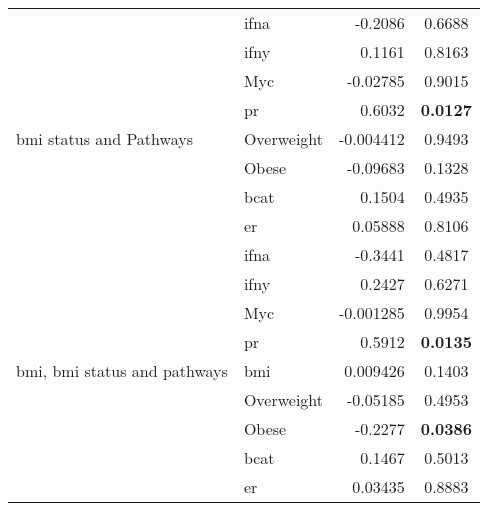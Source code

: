 \begin{table}[htpb]
\begin{threeparttable}
\begin{tabular}{llrc}
                                                                           & \gls{ifna} & -0.2086   & 0.6688 \\
                                                                           & \gls{ifny} & 0.1161    & 0.8163 \\
                                                                           & Myc        & -0.02785  & 0.9015 \\
                                                                           & \gls{pr}   & 0.6032    & \bfseries 0.0127  \\
				\hline
				\rule{0pt}{2.25ex}\gls{bmi} status and Pathways            & Overweight & -0.004412 & 0.9493 \\
                                                                           & Obese      & -0.09683  & 0.1328 \\
                                                                           & \gls{bcat} & 0.1504    & 0.4935 \\
                                                                           & \gls{er}   & 0.05888   & 0.8106 \\
                                                                           & \gls{ifna} & -0.3441   & 0.4817 \\
                                                                           & \gls{ifny} & 0.2427    & 0.6271 \\
                                                                           & Myc        & -0.001285 & 0.9954 \\
                                                                           & \gls{pr}   & 0.5912    & \bfseries 0.0135  \\
				\hline
				\rule{0pt}{2.25ex}\gls{bmi}, \gls{bmi} status and pathways & \gls{bmi}  & 0.009426  & 0.1403 \\
                                                                           & Overweight & -0.05185  & 0.4953 \\
                                                                           & Obese      & -0.2277   & \bfseries 0.0386  \\
                                                                           & \gls{bcat} & 0.1467    & 0.5013 \\
                                                                           & \gls{er}   & 0.03435   & 0.8883 \\

\end{tabular}
\end{threeparttable}
\end{table}
